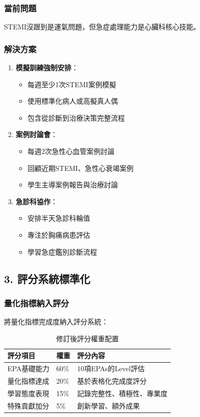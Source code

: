 \documentclass[12pt,a4paper]{article}
\begin{document}
\subsubsection{當前問題}
STEMI沒跟到是運氣問題，但急症處理能力是心臟科核心技能。

\subsubsection{解決方案}
\begin{enumerate}
\item \textbf{模擬訓練強制安排}：
   \begin{itemize}
   \item 每週至少1次STEMI案例模擬
   \item 使用標準化病人或高擬真人偶
   \item 包含從診斷到治療決策完整流程
   \end{itemize}

\item \textbf{案例討論會}：
   \begin{itemize}
   \item 每週2次急性心血管案例討論
   \item 回顧近期STEMI、急性心衰竭案例
   \item 學生主導案例報告與治療討論
   \end{itemize}

\item \textbf{急診科協作}：
   \begin{itemize}
   \item 安排半天急診科輪值
   \item 專注於胸痛病患評估
   \item 學習急症鑑別診斷流程
   \end{itemize}
\end{enumerate}

\subsection{3. 評分系統標準化}

\subsubsection{量化指標納入評分}
將量化指標完成度納入評分系統：

\begin{table}[h]
\centering
\caption{修訂後評分權重配置}
\begin{tabular}{|p{4cm}|p{2cm}|p{6cm}|}
\hline
\textbf{評分項目} & \textbf{權重} & \textbf{評分內容} \\
\hline
EPA基礎能力 & 60\% & 10項EPAs的Level評估 \\
\hline
量化指標達成 & 20\% & 基於表格化完成度評分 \\
\hline
學習態度表現 & 15\% & 記錄完整性、積極性、專業度 \\
\hline
特殊貢獻加分 & 5\% & 創新學習、額外成果 \\
\hline
\end{tabular}
\end{table}
\end{document}
